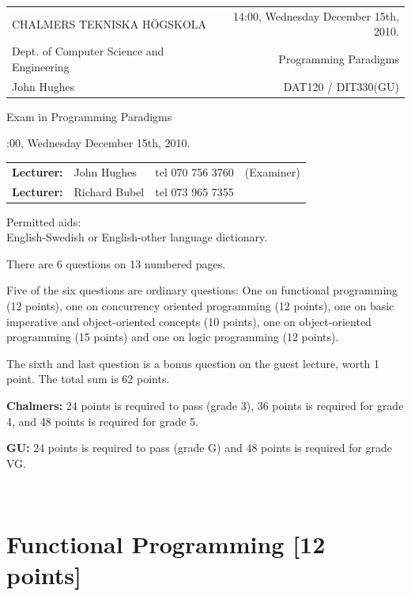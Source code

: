\documentclass{article}
\begin{document}
\newcommand{\examtime}{14:00, Wednesday December 15th, 2010}
\newcommand{\points}[1]{\marginpar{\bf #1 points}}
\noindent
\begin{tabular}{lr}
CHALMERS TEKNISKA H\"OGSKOLA &\examtime{}.\\
Dept. of Computer Science and Engineering & Programming Paradigms\\
John Hughes                  & DAT120 / DIT330(GU) \\
\end{tabular}

\vspace{2.5cm} \noindent
\begin{center} {\LARGE
Exam in Programming Paradigms}
\end{center}

\vspace{1.5cm}

\noindent
\examtime{}.\\
\begin{tabular}{lllc}
\textbf{Lecturer:} &  John Hughes  & tel 070 756 3760 & (Examiner)\\
\textbf{Lecturer:} & Richard Bubel & tel 073 965 7355 & \\ 
\end{tabular}
\vspace{1cm}

\noindent
Permitted aids:\\
English-Swedish or English-other language dictionary.

There are 6 questions on 13 numbered pages. 

Five of the six questions are ordinary questions: One on functional
programming (12 points), one on concurrency oriented programming (12
points), one on basic imperative and object-oriented concepts (10
points), one on object-oriented programming (15 points) and one on
logic programming (12 points).

The sixth and last question is a bonus question on the guest lecture,
worth 1 point. The total sum is 62 points.


\textbf{Chalmers:}
24 points is required to pass (grade 3), 36 points is required for
grade 4, and 48 points is required for grade 5. 

\textbf{GU:}
24 points is required to pass (grade G) and 48 points is required for
grade VG.


\newpage 
\hfill\\
\newpage

\section{Functional Programming [12 points]}
\end{document}
